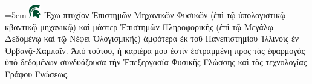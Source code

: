 



        \font=5em \includegraphics[width=5mm]{icon.png} Ἔχω πτυχίον Ἐπιστημῶν Μηχανικῶν Φυσικῶν (ἐπὶ τῷ ὑπολογιστικῷ κβαντικῷ μηχανικῷ) καὶ μάστερ Ἐπιστημῶν Πληροφορικῆς (ἐπὶ τῷ Μεγάλῳ Δεδομένῳ καὶ τῷ Νέφει Ὀλογισμικῆς) ἀμφότερα ἐκ τοῦ Πανεπιστημίου Ἰλλινόις ἐν Ὀρβανᾷ-Χαμπαῖν. Ἀπὸ τούτου, ἡ καριέρα μου ἐστὶν ἐστραμμένη πρὸς τὰς ἐφαρμογὰς ὑπὸ δεδομένων συνδυάζουσα τὴν Ἐπεξεργασία Φυσικῆς Γλώσσης καὶ τὰς τεχνολογίας Γράφου Γνώσεως.




